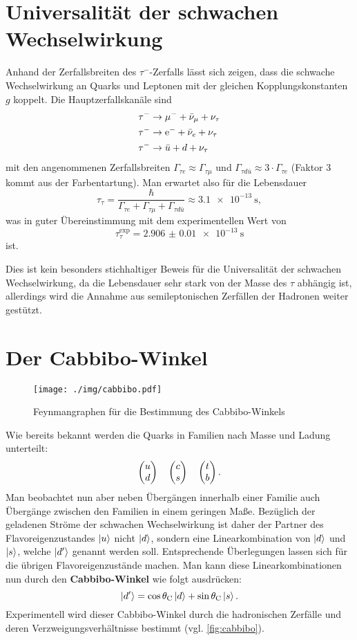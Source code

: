 \section{Universalität der schwachen Wechselwirkung}
Anhand der Zerfallsbreiten des $\tau^-$-Zerfalls lässt sich zeigen, dass die schwache Wechselwirkung an Quarks und Leptonen mit der gleichen Kopplungskonstanten $g$ koppelt.
Die Hauptzerfallskanäle sind
\begin{align*}
	\tau^- &\rightarrow \mu^- + \bar{\nu}_\mu + \nu_\tau \\
	\tau^- &\rightarrow \text{e}^- + \bar{\nu}_e + \nu_\tau \\
	\tau^- &\rightarrow \bar{u} + d + \nu_\tau
\end{align*}
mit den angenommenen Zerfallsbreiten $\Gamma_{\tau e} \approx\Gamma_{\tau \mu}$ und $\Gamma_{\tau d\bar{u}}\approx 3\cdot\Gamma_{\tau e}$ (Faktor 3 kommt aus der Farbentartung).
Man erwartet also für die Lebensdauer
\begin{equation*}
	\tau_\tau = \frac{\hbar}{\Gamma_{\tau e} + \Gamma_{\tau \mu} + \Gamma_{\tau d\bar{u}}} \approx \SI{3.1e-13}{\second},
\end{equation*}
was in guter Übereinstimmung mit dem experimentellen Wert von
\begin{equation*}
	\tau_\tau^\text{exp} = \SI{2.906(10)e-13}{\second}
\end{equation*}
ist.

Dies ist kein besonders stichhaltiger Beweis für die Universalität der schwachen Wechselwirkung, da die Lebensdauer sehr stark von der Masse des $\tau$ abhängig ist,
allerdings wird die Annahme aus semileptonischen Zerfällen der Hadronen weiter gestützt.

\section{Der Cabbibo-Winkel}
\begin{figure}
	\centering
	\texttt{[image: ./img/cabbibo.pdf]}
	\caption{Feynmangraphen für die Bestimmung des Cabbibo-Winkels}
	\label{fig:cabbibo}
\end{figure}

Wie bereits bekannt werden die Quarks in Familien nach Masse und Ladung unterteilt:
\begin{equation*}
	\begin{pmatrix} u \\ d \end{pmatrix}\quad\begin{pmatrix} c \\ s \end{pmatrix}\quad\begin{pmatrix} t \\ b \end{pmatrix}.
\end{equation*}
Man beobachtet nun aber neben Übergängen innerhalb einer Familie auch Übergänge zwischen den Familien in einem geringen Maße.
Bezüglich der geladenen Ströme der schwachen Wechselwirkung ist daher der Partner des Flavoreigenzustandes $\ket{u}$ nicht $\ket{d}$, sondern eine Linearkombination von $\ket{d}$ und $\ket{s}$, welche $\ket{d'}$ genannt werden soll.
Entsprechende Überlegungen lassen sich für die übrigen Flavoreigenzustände machen.
Man kann diese Linearkombinationen nun durch den \textbf{Cabbibo-Winkel} wie folgt ausdrücken:
\begin{equation*}
	\ket{d'} = \cos\theta_\text{C}\ket{d} + \sin\theta_\text{C}\ket{s}.
\end{equation*}
Experimentell wird dieser Cabbibo-Winkel durch die hadronischen Zerfälle und deren Verzweigungsverhältnisse bestimmt (vgl. \autoref{fig:cabbibo}).
